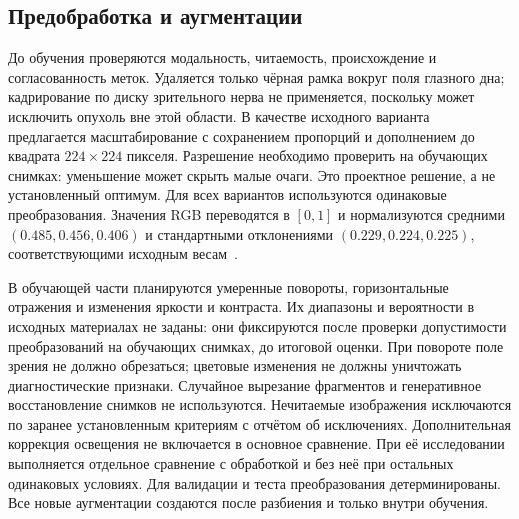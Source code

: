 \documentclass{misisarticle}
\begin{document}
\subsection{Предобработка и аугментации}
До обучения проверяются модальность, читаемость, происхождение и согласованность меток. Удаляется только чёрная рамка вокруг поля глазного дна; кадрирование по диску зрительного нерва не применяется, поскольку может исключить опухоль вне этой области. В качестве исходного варианта предлагается масштабирование с сохранением пропорций и дополнением до квадрата $224\times224$ пикселя. Разрешение необходимо проверить на обучающих снимках: уменьшение может скрыть малые очаги. Это проектное решение, а не установленный оптимум. Для всех вариантов используются одинаковые преобразования. Значения RGB переводятся в $[0,1]$ и нормализуются средними $(0.485,0.456,0.406)$ и стандартными отклонениями $(0.229,0.224,0.225)$, соответствующими исходным весам~\cite{torchvision}.

В обучающей части планируются умеренные повороты, горизонтальные отражения и изменения яркости и контраста. Их диапазоны и вероятности в исходных материалах не заданы: они фиксируются после проверки допустимости преобразований на обучающих снимках, до итоговой оценки. При повороте поле зрения не должно обрезаться; цветовые изменения не должны уничтожать диагностические признаки. Случайное вырезание фрагментов и генеративное восстановление снимков не используются. Нечитаемые изображения исключаются по заранее установленным критериям с отчётом об исключениях. Дополнительная коррекция освещения не включается в основное сравнение. При её исследовании выполняется отдельное сравнение с обработкой и без неё при остальных одинаковых условиях. Для валидации и теста преобразования детерминированы. Все новые аугментации создаются после разбиения и только внутри обучения.
\end{document}
